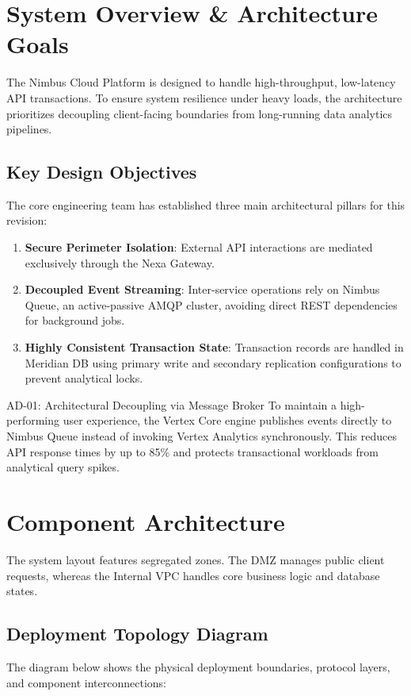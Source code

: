 \documentclass[11pt,a4paper]{article}
\begin{document}
\newpage

\section{System Overview \& Architecture Goals}
The Nimbus Cloud Platform is designed to handle high-throughput, low-latency API transactions. To ensure system resilience under heavy loads, the architecture prioritizes decoupling client-facing boundaries from long-running data analytics pipelines.

\subsection{Key Design Objectives}
The core engineering team has established three main architectural pillars for this revision:
\begin{enumerate}[label=\textbf{\lbrack R\arabic*\rbrack}]
  \item \textbf{Secure Perimeter Isolation}: External API interactions are mediated exclusively through the Nexa Gateway.
  \item \textbf{Decoupled Event Streaming}: Inter-service operations rely on Nimbus Queue, an active-passive AMQP cluster, avoiding direct REST dependencies for background jobs.
  \item \textbf{Highly Consistent Transaction State}: Transaction records are handled in Meridian DB using primary write and secondary replication configurations to prevent analytical locks.
\end{enumerate}

\begin{decision}{AD-01: Architectural Decoupling via Message Broker}
To maintain a high-performing user experience, the Vertex Core engine publishes events directly to Nimbus Queue instead of invoking Vertex Analytics synchronously. This reduces API response times by up to 85\% and protects transactional workloads from analytical query spikes.
\end{decision}

\section{Component Architecture}
The system layout features segregated zones. The DMZ manages public client requests, whereas the Internal VPC handles core business logic and database states.

\subsection{Deployment Topology Diagram}
The diagram below shows the physical deployment boundaries, protocol layers, and component interconnections:
\end{document}
